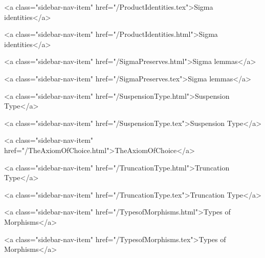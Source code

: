       
        
          <a class="sidebar-nav-item" href="/ProductIdentities.tex">Sigma identities</a>
        
      
    
      
        
          <a class="sidebar-nav-item" href="/ProductIdentities.html">Sigma identities</a>
        
      
    
      
        
          <a class="sidebar-nav-item" href="/SigmaPreserves.html">Sigma lemmas</a>
        
      
    
      
        
          <a class="sidebar-nav-item" href="/SigmaPreserves.tex">Sigma lemmas</a>
        
      
    
      
        
          <a class="sidebar-nav-item" href="/SuspensionType.html">Suspension Type</a>
        
      
    
      
        
          <a class="sidebar-nav-item" href="/SuspensionType.tex">Suspension Type</a>
        
      
    
      
        
          <a class="sidebar-nav-item" href="/TheAxiomOfChoice.html">TheAxiomOfChoice</a>
        
      
    
      
        
          <a class="sidebar-nav-item" href="/TruncationType.html">Truncation Type</a>
        
      
    
      
        
          <a class="sidebar-nav-item" href="/TruncationType.tex">Truncation Type</a>
        
      
    
      
        
          <a class="sidebar-nav-item" href="/TypesofMorphisms.html">Types of Morphisms</a>
        
      
    
      
        
          <a class="sidebar-nav-item" href="/TypesofMorphisms.tex">Types of Morphisms</a>
        
